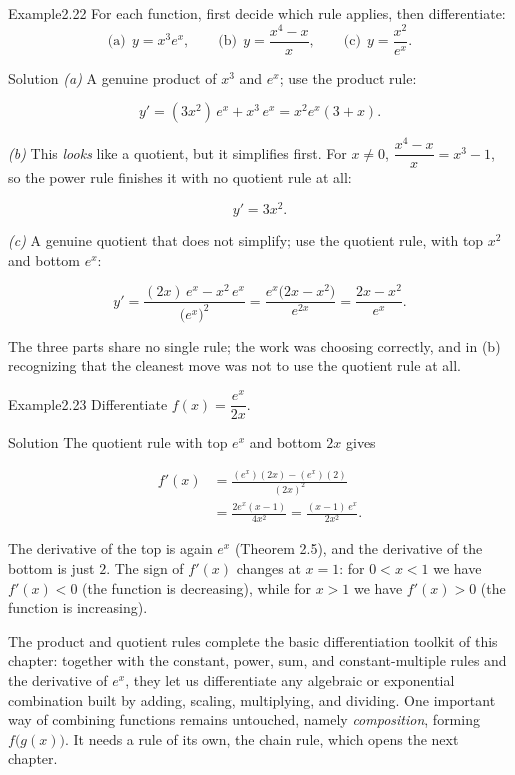 \documentclass[a4paper,12pt,oneside]{memoir}
\begin{document}
\begin{workedexample}
\begin{envexample}{Example}{2.22}{}
For each function, first decide which rule applies, then differentiate: \[ \text{(a)}\ \ y = x^{3} e^{x}, \qquad \text{(b)}\ \ y = \frac{x^{4} - x}{x}, \qquad \text{(c)}\ \ y = \frac{x^{2}}{e^{x}}. \]
\end{envexample}
\begin{envsolution}{Solution}{}{}
\emph{(a)} A genuine product of \(x^{3}\) and \(e^{x}\); use the product rule:

\[ y' = (3x^{2})\,e^{x} + x^{3}\,e^{x} = x^{2} e^{x}(3 + x). \]

\emph{(b)} This \emph{looks} like a quotient, but it simplifies first. For \(x \ne 0\), \(\dfrac{x^{4} - x}{x} = x^{3} - 1\), so the power rule finishes it with no quotient rule at all:

\[ y' = 3x^{2}. \]

\emph{(c)} A genuine quotient that does not simplify; use the quotient rule, with top \(x^{2}\) and bottom \(e^{x}\):

\[ y' = \frac{(2x)\,e^{x} - x^{2}\,e^{x}}{\bigl(e^{x}\bigr)^{2}} = \frac{e^{x}\bigl(2x - x^{2}\bigr)}{e^{2x}} = \frac{2x - x^{2}}{e^{x}}. \]

The three parts share no single rule; the work was choosing correctly, and in (b) recognizing that the cleanest move was not to use the quotient rule at all.
\end{envsolution}
\end{workedexample}
\begin{workedexample}
\begin{envexample}{Example}{2.23}{}
Differentiate \(f(x) = \dfrac{e^{x}}{2x}\).
\end{envexample}
\begin{envsolution}{Solution}{}{}
The quotient rule with top \(e^{x}\) and bottom \(2x\) gives

\[ \begin{aligned}
          f'(x) &= \frac{(e^{x})(2x) - (e^{x})(2)}{(2x)^{2}} \\[2pt]
                &= \frac{2e^{x}(x - 1)}{4x^{2}}
                 = \frac{(x - 1)\,e^{x}}{2x^{2}}.
        \end{aligned} \]

The derivative of the top is again \(e^{x}\) (Theorem 2.5), and the derivative of the bottom is just \(2\). The sign of \(f'(x)\) changes at \(x = 1\): for \(0 < x < 1\) we have \(f'(x) < 0\) (the function is decreasing), while for \(x > 1\) we have \(f'(x) > 0\) (the function is increasing).
\end{envsolution}
\end{workedexample}
The product and quotient rules complete the basic differentiation toolkit of this chapter: together with the constant, power, sum, and constant-multiple rules and the derivative of \(e^{x}\), they let us differentiate any algebraic or exponential combination built by adding, scaling, multiplying, and dividing. One important way of combining functions remains untouched, namely \emph{composition}, forming \(f\bigl(g(x)\bigr)\). It needs a rule of its own, the chain rule, which opens the next chapter.
\end{document}
